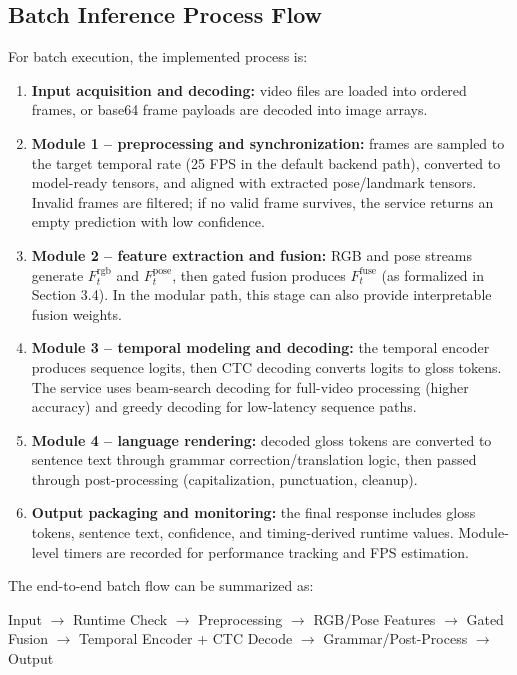 \subsection{Batch Inference Process Flow  }
For batch execution, the implemented process is:
\begin{enumerate}[leftmargin=1.5em]
\item \textbf{Input acquisition and decoding:}
video files are loaded into ordered frames, or base64 frame payloads are decoded into image arrays.

\item \textbf{Module 1 -- preprocessing and synchronization:}
frames are sampled to the target temporal rate (25 FPS in the default backend path), converted to model-ready tensors, and aligned with extracted pose/landmark tensors. Invalid frames are filtered; if no valid frame survives, the service returns an empty prediction with low confidence.

\item \textbf{Module 2 -- feature extraction and fusion:}
RGB and pose streams generate $F_t^{\mathrm{rgb}}$ and $F_t^{\mathrm{pose}}$, then gated fusion produces $F_t^{\mathrm{fuse}}$ (as formalized in Section 3.4). In the modular path, this stage can also provide interpretable fusion weights.

\item \textbf{Module 3 -- temporal modeling and decoding:}
the temporal encoder produces sequence logits, then CTC decoding converts logits to gloss tokens. The service uses beam-search decoding for full-video processing (higher accuracy) and greedy decoding for low-latency sequence paths.

\item \textbf{Module 4 -- language rendering:}
decoded gloss tokens are converted to sentence text through grammar correction/translation logic, then passed through post-processing (capitalization, punctuation, cleanup).

\item \textbf{Output packaging and monitoring:}
the final response includes gloss tokens, sentence text, confidence, and timing-derived runtime values. Module-level timers are recorded for performance tracking and FPS estimation.
\end{enumerate}

The end-to-end batch flow can be summarized as:
\begin{center}
Input $\rightarrow$ Runtime Check $\rightarrow$ Preprocessing $\rightarrow$ RGB/Pose Features $\rightarrow$ Gated Fusion $\rightarrow$ Temporal Encoder + CTC Decode $\rightarrow$ Grammar/Post-Process $\rightarrow$ Output
\end{center}


